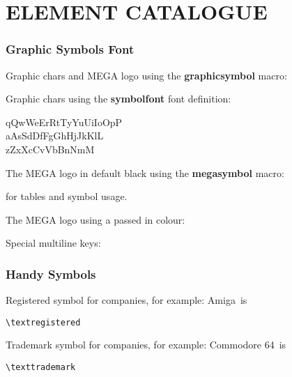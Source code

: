 %
%
%


\part{ELEMENT CATALOGUE}

\section{Graphic Symbols Font}

Graphic chars and MEGA logo using the {\bf graphicsymbol} macro:


Graphic chars using the {\bf symbolfont} font definition:

\begin{symbolfont}%
	qQwWeErRtTyYuUiIoOpP\\
	aAsSdDfFgGhHjJkKlL\\
	zZxXcCvVbBnNmM%
\end{symbolfont}%

The MEGA logo in default black using the {\bf megasymbol} macro:

\megasymbol for tables and symbol usage.

The MEGA logo using a passed in colour:

\megasymbol[black]
\megasymbol[brown]
\megasymbol[orange]
\megasymbol[blue]

Special multiline keys:
%
%
%
%
%
%
%

\section{Handy Symbols}
Registered symbol for companies, for example: Amiga\textregistered \ is \begin{verbatim}
\textregistered
\end{verbatim}

Trademark symbol for companies, for example: Commodore 64\texttrademark \ is \begin{verbatim}
\texttrademark
\end{verbatim}

